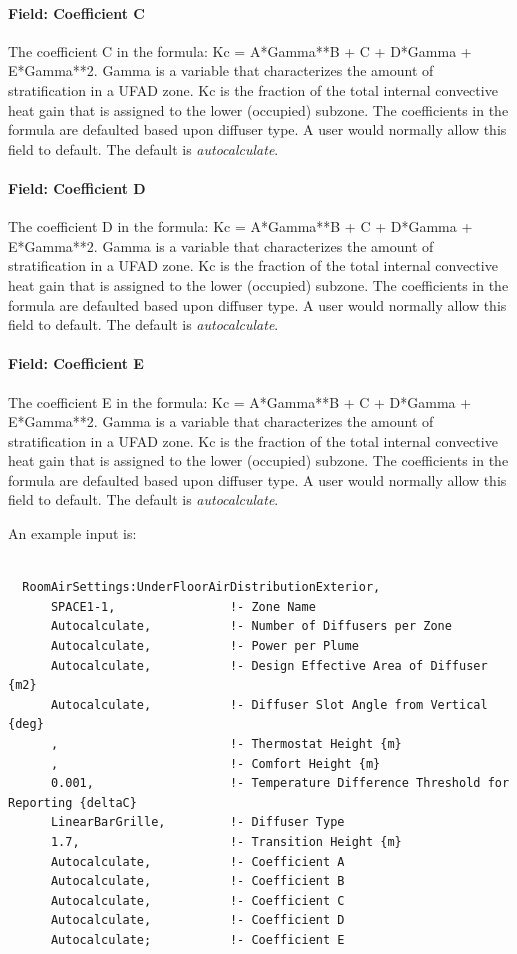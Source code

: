 \paragraph{Field: Coefficient C}\label{field-coefficient-c-1}

The coefficient C in the formula: Kc = A*Gamma**B + C + D*Gamma + E*Gamma**2. Gamma is a variable that characterizes the amount of stratification in a UFAD zone. Kc is the fraction of the total internal convective heat gain that is assigned to the lower (occupied) subzone. The coefficients in the formula are defaulted based upon diffuser type. A user would normally allow this field to default. The default is \emph{autocalculate}.

\paragraph{Field: Coefficient D}\label{field-coefficient-d-1}

The coefficient D in the formula: Kc = A*Gamma**B + C + D*Gamma + E*Gamma**2. Gamma is a variable that characterizes the amount of stratification in a UFAD zone. Kc is the fraction of the total internal convective heat gain that is assigned to the lower (occupied) subzone. The coefficients in the formula are defaulted based upon diffuser type. A user would normally allow this field to default. The default is \emph{autocalculate}.

\paragraph{Field: Coefficient E}\label{field-coefficient-e-1}

The coefficient E in the formula: Kc = A*Gamma**B + C + D*Gamma + E*Gamma**2. Gamma is a variable that characterizes the amount of stratification in a UFAD zone. Kc is the fraction of the total internal convective heat gain that is assigned to the lower (occupied) subzone. The coefficients in the formula are defaulted based upon diffuser type. A user would normally allow this field to default. The default is \emph{autocalculate}.

An example input is:

\begin{lstlisting}

  RoomAirSettings:UnderFloorAirDistributionExterior,
      SPACE1-1,                !- Zone Name
      Autocalculate,           !- Number of Diffusers per Zone
      Autocalculate,           !- Power per Plume
      Autocalculate,           !- Design Effective Area of Diffuser {m2}
      Autocalculate,           !- Diffuser Slot Angle from Vertical {deg}
      ,                        !- Thermostat Height {m}
      ,                        !- Comfort Height {m}
      0.001,                   !- Temperature Difference Threshold for Reporting {deltaC}
      LinearBarGrille,         !- Diffuser Type
      1.7,                     !- Transition Height {m}
      Autocalculate,           !- Coefficient A
      Autocalculate,           !- Coefficient B
      Autocalculate,           !- Coefficient C
      Autocalculate,           !- Coefficient D
      Autocalculate;           !- Coefficient E
\end{lstlisting}


